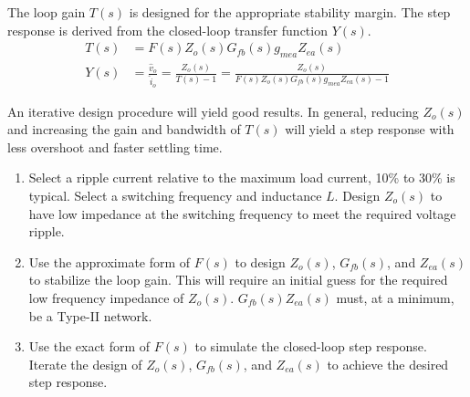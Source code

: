 \documentclass{tufte-handout}
\begin{document}
The loop gain $T(s)$ is designed for the appropriate stability margin.
The step response is derived from the closed-loop transfer function $Y(s)$.
\begin{align*}
T(s)&=F(s)Z_o(s)G_{fb}(s)g_{mea}Z_{ea}(s)\\[0.75em]
Y(s)&=\frac{\widehat{v}_o}{\widehat{i}_o}=\frac{Z_o(s)}{T(s)-1}=\frac{Z_o(s)}{F(s)Z_o(s)G_{fb}(s)g_{mea}Z_{ea}(s)-1}
\end{align*}

An iterative design procedure will yield good results.
In general, reducing $Z_o(s)$ and increasing the gain and bandwidth of $T(s)$ will yield a step response with less overshoot and faster settling time.
\begin{enumerate}
\item Select a ripple current relative to the maximum load current, 10\% to 30\% is typical.
Select a switching frequency and inductance $L$.
Design $Z_o(s)$ to have low impedance at the switching frequency to meet the required voltage ripple.
\item Use the approximate form of $F(s)$ to design $Z_o(s)$, $G_{fb}(s)$, and $Z_{ea}(s)$ to stabilize the loop gain.
This will require an initial guess for the required low frequency impedance of $Z_o(s)$. $G_{fb}(s)Z_{ea}(s)$ must, at a minimum, be a Type-II network.
\item Use the exact form of $F(s)$ to simulate the closed-loop step response. Iterate the design of $Z_o(s)$, $G_{fb}(s)$, and $Z_{ea}(s)$ to achieve the desired step response.
\end{enumerate}
\end{document}
